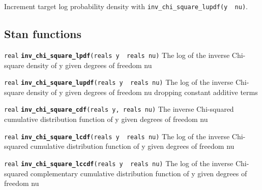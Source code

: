 \documentclass[
  10pt,
]{book}
\begin{document}
Increment target log probability density with \texttt{inv\_chi\_square\_lupdf(y\ \textbar{}\ nu)}.

\hypertarget{stan-functions-33}{%
\subsection{Stan functions}\label{stan-functions-33}}


\texttt{real} \textbf{\texttt{inv\_chi\_square\_lpdf}}\texttt{(reals\ y\ \textbar{}\ reals\ nu)}\newline
The log of the inverse Chi-square density of y given degrees of
freedom nu


\texttt{real} \textbf{\texttt{inv\_chi\_square\_lupdf}}\texttt{(reals\ y\ \textbar{}\ reals\ nu)}\newline
The log of the inverse Chi-square density of y given degrees of
freedom nu dropping constant additive terms


\texttt{real} \textbf{\texttt{inv\_chi\_square\_cdf}}\texttt{(reals\ y,\ reals\ nu)}\newline
The inverse Chi-squared cumulative distribution function of y given
degrees of freedom nu


\texttt{real} \textbf{\texttt{inv\_chi\_square\_lcdf}}\texttt{(reals\ y\ \textbar{}\ reals\ nu)}\newline
The log of the inverse Chi-squared cumulative distribution function of
y given degrees of freedom nu


\texttt{real} \textbf{\texttt{inv\_chi\_square\_lccdf}}\texttt{(reals\ y\ \textbar{}\ reals\ nu)}\newline
The log of the inverse Chi-squared complementary cumulative
distribution function of y given degrees of freedom nu
\end{document}

